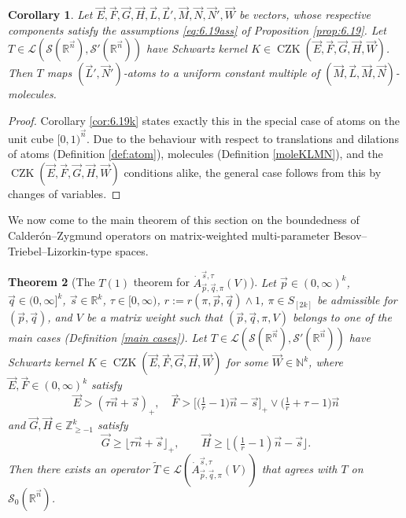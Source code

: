 \documentclass[11pt, reqno]{amsart}
\newtheorem{theorem}{Theorem}[section]
\newtheorem{corollary}[theorem]{Corollary}
\theoremstyle{definition}
\theoremstyle{remark}
\numberwithin{equation}{section}
\newcommand{\vE}{\vec E}
\newcommand{\vF}{\vec F}
\newcommand{\N}{\mathbb N}
\newcommand{\R}{\mathbb R}
\newcommand{\Z}{\mathbb Z}
\newcommand{\vn}{\vec n}
\newcommand{\vp}{\vec p}
\newcommand{\vq}{\vec q}
\newcommand{\vs}{\vec s}
\newcommand{\Atau}{\dot A^{\vs,\tau}_{\vp,\vq,\pi}}
\newcommand{\floor}[1]{\lfloor #1 \rfloor}
\begin{document}
\begin{corollary}\label{cor:6.19kk}
Let $\vE,\vF,\vec G,\vec H,\vec L,\vec L',\vec M,\vec N,\vec N',\vec W$ be vectors, whose respective components satisfy the assumptions \eqref{eq:6.19ass} of Proposition \ref{prop:6.19}.
Let $T\in\mathcal L(\mathscr S(\R^{\vn}),\mathscr S'(\R^{\vn}))$ have Schwartz kernel $K\in\operatorname{CZK}(\vE,\vF,\vec G,\vec H,\vec W)$.
Then $T$ maps $(\vec L',\vec N')$-atoms to a
uniform constant multiple of $(\vec M,\vec L,\vec M,\vec N)$-molecules.
\end{corollary}

\begin{proof}
Corollary \ref{cor:6.19k} states exactly this in the special case of atoms on the unit cube $[0,1)^{\vn}$. Due to the behaviour with respect to translations and dilations of atoms (Definition \ref{def:atom}), molecules (Definition \ref{moleKLMN}), and the $\operatorname{CZK}(\vec E,\vec F,\vec G,\vec H,\vec W)$ conditions alike, the general case follows from this by changes of variables.
\end{proof}

We now come to the main theorem of this section on the boundedness of Calder\'on--Zygmund operators on matrix-weighted multi-parameter Besov--Triebel--Lizorkin-type spaces.

\begin{theorem}[The $T(1)$ theorem for $\Atau(V)$]\label{T1 BF}
Let $\vp\in(0,\infty)^k$, $\vq\in(0,\infty]^k$, $\vs\in\R^k$, $\tau\in[0,\infty)$,
$r:=r(\pi,\vec p,\vec q)\wedge 1$,
$\pi\in S_{[2k]}$ be admissible for $(\vp,\vq)$,
and $V$ be a matrix weight such that $(\vp,\vq,\pi,V)$ belongs
to one of the main cases (Definition \ref{main cases}).
Let $T\in\mathcal L(\mathscr S(\R^{\vn}),\mathscr S'(\R^{\vn}))$ have Schwartz kernel
$K\in\operatorname{CZK}(\vE,\vF,\vec G,\vec H,\vec W)$ for some $\vec W\in\N^k$, where
$\vec E,\vec F\in(0,\infty)^k$ satisfy
\begin{equation}\label{eq:T1 EF}
  \vE>(\tau\vn+\vs)_+,\quad
  \vF>\Big[\Big(\tfrac1r-1\Big)\vn-\vs\Big]_+\vee\Big(\tfrac1r+\tau-1\Big)\vn
\end{equation}
and $\vec G,\vec H\in\Z_{\geq-1}^k$ satisfy
\begin{equation}\label{eq:T1 GH}
  \vec G\geq\floor{\tau\vn+\vs}_+,\qquad
  \vec H\geq \floor{(\tfrac{1}{r}-1)\vn-\vs}.
\end{equation}
Then there exists an operator $\widetilde T\in\mathcal L(\Atau(V))$
that agrees with $T$ on $\mathscr{S}_0(\mathbb R^{\vn})$.
\end{theorem}
\end{document}

